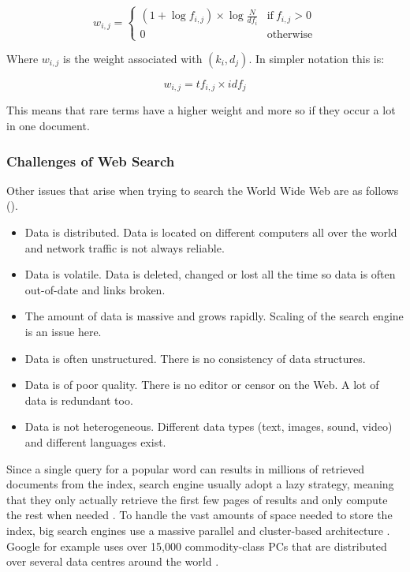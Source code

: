 \begin{equation}
  w_{i,j} =
  \begin{cases}
  (1+\log f_{i,j})\times \log\frac{N}{df_i} & \text{if} \ f_{i,j} > 0 \\
  0 & \text{otherwise}
  \end{cases}
  \label{eq:wij}
\end{equation}

Where $w_{i,j}$ is the weight associated with $(k_i,d_j)$. In simpler notation this is:

\begin{equation}
  w_{i,j} = tf_{i,j}\times idf_j
  \label{eq:wij2}
\end{equation}

This means that rare terms have a higher weight and more so if they occur a lot in one document.

\subsubsection*{Challenges of Web Search}

Other issues that arise when trying to search the World Wide Web are as follows (\citep[p.449]{Baeza-Yates2011}).

\begin{itemize}
  \item Data is distributed. Data is located on different computers all over the world and network traffic is not always reliable.
  \item Data is volatile. Data is deleted, changed or lost all the time so data is often out-of-date and links broken.
  \item The amount of data is massive and grows rapidly. Scaling of the search engine is an issue here.
  \item Data is often unstructured. There is no consistency of data structures.
  \item Data is of poor quality. There is no editor or censor on the Web. A lot of data is redundant too.
  \item Data is not heterogeneous. Different data types (text, images, sound, video) and different languages exist.
\end{itemize}

Since a single query for a popular word can results in  millions of retrieved documents from the index, search engine usually adopt a lazy strategy, meaning that they only actually retrieve the first few pages of results and only compute the rest when needed \citep[p.459]{Baeza-Yates2011}. To handle the vast amounts of space needed to store the index, big search engines use a massive parallel and cluster-based architecture \citep[p.459]{Baeza-Yates2011}. Google for example uses over 15,000 commodity-class PCs that are distributed over several data centres around the world \citep{Dean2003}.

